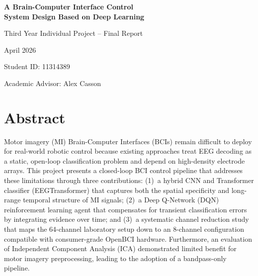 \documentclass[12pt, a4paper]{article}
\begin{document}
\raggedright

\begin{titlepage}
    \centering
    \vspace*{3cm}
    {\LARGE \textbf{A Brain-Computer Interface Control \\ System Design Based on Deep Learning}\par}
    \vspace{1.5cm}
    {\Large Third Year Individual Project -- Final Report\par}
    \vspace{2.5cm}
    {\large April 2026\par}
    \vspace{2cm}
    {\large Student ID: 11314389\par}
    \vfill
    {\large Academic Advisor: Alex Casson\par}
\end{titlepage}

\setcounter{page}{2}

\begin{singlespace}
\tableofcontents
\end{singlespace}
\clearpage

\section*{Abstract}
Motor imagery (MI) Brain-Computer Interfaces (BCIs) remain difficult to deploy for real-world robotic control because existing approaches treat EEG decoding as a static, open-loop classification problem and depend on high-density electrode arrays. This project presents a closed-loop BCI control pipeline that addresses these limitations through three contributions: (1)~a hybrid CNN and Transformer classifier (EEGTransformer) that captures both the spatial specificity and long-range temporal structure of MI signals; (2)~a Deep Q-Network (DQN) reinforcement learning agent that compensates for transient classification errors by integrating evidence over time; and (3)~a systematic channel reduction study that maps the 64-channel laboratory setup down to an 8-channel configuration compatible with consumer-grade OpenBCI hardware. Furthermore, an evaluation of Independent Component Analysis (ICA) demonstrated limited benefit for motor imagery preprocessing, leading to the adoption of a bandpass-only pipeline.
\end{document}
